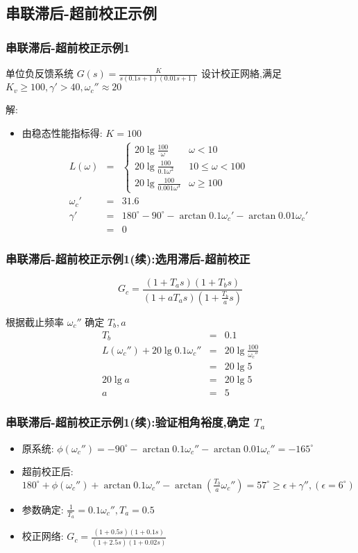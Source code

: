 \documentclass[table]{article}
\begin{document}
\subsection{串联滞后-超前校正示例}
\label{sec-4-2}
\begin{frame}
\frametitle{串联滞后-超前校正示例1}
\label{sec-4-2-1}

单位负反馈系统  $G(s)=\frac{K}{s(0.1s+1)(0.01s+1)}$  设计校正网絡,满足  $K_v \geq 100,\gamma'>40,\omega_c''\approx 20$ 

解:
\begin{itemize}
\item <2->由稳态性能指标得:  $K=100$ 
      \begin{eqnarray*}
      L(\omega) & = &\begin{cases}20\lg\frac{100}{\omega} & \omega<10 \\
                                  20\lg\frac{100}{0.1\omega^2} & 10\leq \omega<100 \\
                                  20\lg\frac{100}{0.001\omega^3} & \omega \geq 100 \end{cases} \\
      \omega_c' &=& 31.6 \\
      \gamma' &=& 180^{\circ}-90^{\circ}-\arctan0.1\omega_c'-\arctan0.01\omega_c' \\
       &=& 0 
      \end{eqnarray*}
\end{itemize}
\end{frame}
\begin{frame}
\frametitle{串联滞后-超前校正示例1(续):选用滞后-超前校正}
\label{sec-4-2-2}


\[G_c = \frac{(1+T_a s)(1+T_b s)}{(1+aT_a s)(1+\frac{T_b}{a}s)}\]

根据截止频率  $\omega_c''$  确定  $T_b,a$ 
\begin{eqnarray*}
T_b & = & 0.1\\
L(\omega_c'') +20\lg0.1\omega_c'' &=& 20\lg\frac{100}{\omega_c''} \\
&=& 20\lg5\\
20\lg a &=& 20\lg5 \\
a &=& 5 
\end{eqnarray*}
\end{frame}
\begin{frame}
\frametitle{串联滞后-超前校正示例1(续):验证相角裕度,确定 $T_{a}$}
\label{sec-4-2-3}

\begin{itemize}
\item 原系统: $\phi(\omega_c'') = -90^{\circ}-\arctan 0.1\omega_c''-\arctan 0.01\omega_c''=-165^{\circ}$
\item 超前校正后: 
       $180^{\circ}+\phi(\omega_c'')+\arctan0.1\omega_c''-\arctan(\frac{T_b}{a}\omega_c'')= 57^{\circ}\geq\epsilon+\gamma'',(\epsilon=6^{\circ})$
\item 参数确定: $\frac{1}{T_a} =0.1\omega_c'',T_a = 0.5$
\item 校正网络: 
       	$G_c=\frac{(1+0.5s)(1+0.1s)}{(1+2.5s)(1+0.02s)}$
\end{itemize}
\end{frame}
\end{document}
